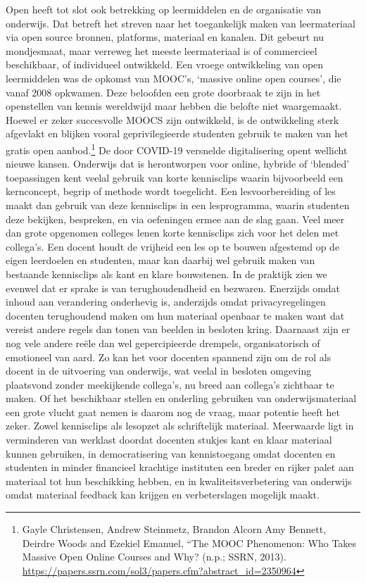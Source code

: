 \documentclass[empirical, authordate, ]{new-jote-article}
\begin{document}
	Open heeft tot slot ook betrekking op leermiddelen en de organisatie van onderwijs. Dat betreft het streven naar het toegankelijk maken van leermateriaal via open source bronnen, platforms, materiaal en kanalen. Dit gebeurt nu mondjesmaat, maar verreweg het meeste leermateriaal is of commercieel beschikbaar, of individueel ontwikkeld. Een vroege ontwikkeling van open leermiddelen was de opkomst van MOOC's, ‘massive online open courses', die vanaf 2008 opkwamen. Deze beloofden een grote doorbraak te zijn in het openstellen van kennis wereldwijd maar hebben die belofte niet waargemaakt. Hoewel er zeker succesvolle MOOCS zijn ontwikkeld, is de ontwikkeling sterk afgevlakt en blijken vooral geprivilegieerde studenten gebruik te maken van het gratis open aanbod.\footnote{Gayle Christensen, Andrew Steinmetz, Brandon Alcorn Amy Bennett, Deirdre Woods and Ezekiel Emanuel, “The MOOC Phenomenon: Who Takes Massive Open Online Courses and Why? (n.p.; SSRN, 2013). \href{https://papers.ssrn.com/sol3/papers.cfm?abstract_id=2350964}{https://papers.ssrn.com/sol3/papers.cfm?abstract\_id=2350964} } De door COVID-19 versnelde digitalisering opent wellicht nieuwe kansen. Onderwijs dat is herontworpen voor online, hybride of ‘blended' toepassingen kent veelal gebruik van korte kennisclips waarin bijvoorbeeld een kernconcept, begrip of methode wordt toegelicht. Een lesvoorbereiding of les maakt dan gebruik van deze kennisclips in een lesprogramma, waarin studenten deze bekijken, bespreken, en via oefeningen ermee aan de slag gaan. Veel meer dan grote opgenomen colleges lenen korte kennisclips zich voor het delen met collega's. Een docent houdt de vrijheid een les op te bouwen afgestemd op de eigen leerdoelen en studenten, maar kan daarbij wel gebruik maken van bestaande kennisclips als kant en klare bouwstenen. In de praktijk zien we evenwel dat er sprake is van terughoudendheid en bezwaren. Enerzijds omdat inhoud aan verandering onderhevig is, anderzijds omdat privacyregelingen docenten terughoudend maken om hun materiaal openbaar te maken want dat vereist andere regels dan tonen van beelden in besloten kring. Daarnaast zijn er nog vele andere reële dan wel gepercipieerde drempels, organisatorisch of emotioneel van aard. Zo kan het voor docenten spannend zijn om de rol als docent in de uitvoering van onderwijs, wat veelal in besloten omgeving plaatsvond zonder meekijkende collega's, nu breed aan collega's zichtbaar te maken. Of het beschikbaar stellen en onderling gebruiken van onderwijsmateriaal een grote vlucht gaat nemen is daarom nog de vraag, maar potentie heeft het zeker. Zowel kennisclips als lesopzet als schriftelijk materiaal. Meerwaarde ligt in verminderen van werklast doordat docenten stukjes kant en klaar materiaal kunnen gebruiken, in democratisering van kennistoegang omdat docenten en studenten in minder financieel krachtige instituten een breder en rijker palet aan materiaal tot hun beschikking hebben, en in kwaliteitsverbetering van onderwijs omdat materiaal feedback kan krijgen en verbeterslagen mogelijk maakt.
\end{document}
